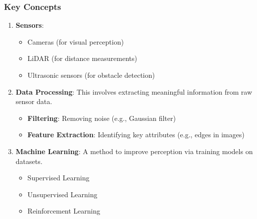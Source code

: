 \documentclass{beamer}
\begin{document}
\begin{frame}[fragile]
    \frametitle{Key Concepts}
    \begin{enumerate}
        \item \textbf{Sensors}:
        \begin{itemize}
            \item Cameras (for visual perception)
            \item LiDAR (for distance measurements)
            \item Ultrasonic sensors (for obstacle detection)
        \end{itemize}

        \item \textbf{Data Processing}:
        This involves extracting meaningful information from raw sensor data.
        \begin{itemize}
            \item \textbf{Filtering}: Removing noise (e.g., Gaussian filter)
            \item \textbf{Feature Extraction}: Identifying key attributes (e.g., edges in images)
        \end{itemize}

        \item \textbf{Machine Learning}:
        A method to improve perception via training models on datasets.
        \begin{itemize}
            \item Supervised Learning
            \item Unsupervised Learning
            \item Reinforcement Learning
        \end{itemize}
    \end{enumerate}
\end{frame}
\end{document}
